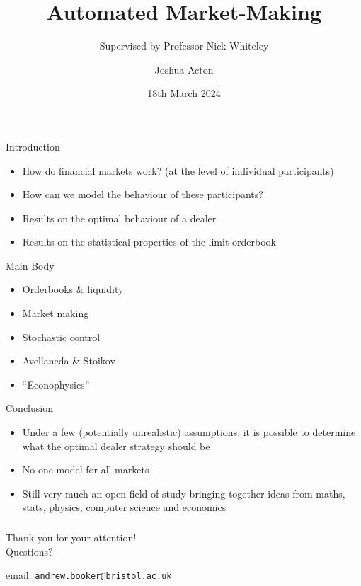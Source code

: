 \documentclass{beamer} %
\title{Automated Market-Making}
\author{Joshua Acton}
\date{18th March 2024}
\subtitle{Supervised by Professor Nick Whiteley}
\begin{document}
\begin{frame}
    \titlepage
\end{frame}

\begin{frame}{Introduction}
    \begin{itemize}
    \item How do financial markets work? (at the level of individual participants)
    \item How can we model the behaviour of these participants?
    \item Results on the optimal behaviour of a dealer
    \item Results on the statistical properties of the limit orderbook
    \end{itemize}
\end{frame}

\begin{frame}{Main Body}
    \begin{itemize}
        \item Orderbooks \& liquidity
        \item Market making
        \item Stochastic control
        \item Avellaneda \& Stoikov
        \item ``Econophysics''
    \end{itemize}
\end{frame}

\begin{frame}{Conclusion}
    \begin{itemize}
        \item Under a few (potentially unrealistic) assumptions, it is
        possible to determine what the optimal dealer strategy should be
        \item No one model for all markets
        \item Still very much an open field of study bringing together ideas
        from maths, stats, physics, computer science and economics
    \end{itemize}
\end{frame}

\begin{frame}
    \frametitle{}
    \begin{center}
        \large{Thank you for your attention!}\\
        \vspace{1cm}
        Questions?
        \vspace{2cm}

        email: \texttt{andrew.booker@bristol.ac.uk}
    \end{center}
\end{frame}
\end{document}
